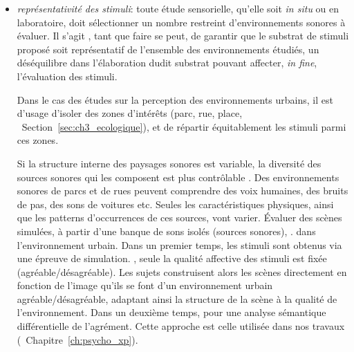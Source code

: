 \begin{itemize}
\item \emph{représentativité des stimuli}: toute étude sensorielle, qu'elle soit \emph{in situ} ou en laboratoire, doit sélectionner un nombre restreint d'environnements sonores à évaluer. Il s'agit , tant que faire se peut, de garantir que le substrat de stimuli proposé soit représentatif de l'ensemble des environnements étudiés, un déséquilibre dans l'élaboration dudit substrat pouvant affecter, \emph{in fine}, l'évaluation des stimuli. 

Dans le cas des études sur la perception des environnements urbains, il est d'usage d'isoler des zones d’intérêts (parc, rue, place, \cf~Section~\ref{sec:ch3_ecologique}), et de répartir équitablement les stimuli parmi ces zones.  

Si la structure interne des paysages sonores est variable, la diversité des sources sonores qui les composent est plus contrôlable . Des environnements sonores de parcs et de rues peuvent comprendre des voix humaines, des bruits de pas, des sons de voitures etc. Seules les caractéristiques physiques, ainsi que les patterns d'occurrences de ces sources, vont varier. Évaluer des scènes simulées, à partir d'une banque de sons isolés (sources sonores),  .   dans l'environnement urbain. Dans un premier temps, les stimuli sont obtenus via une épreuve de simulation.  , seule la qualité affective des stimuli est fixée (agréable/désagréable). Les sujets construisent alors les scènes directement en fonction de l'image qu'ils se font d'un environnement urbain agréable/désagréable, adaptant ainsi la structure de la scène à la qualité de l'environnement. Dans un deuxième temps,   pour une analyse sémantique différentielle de l'agrément. Cette approche est  celle utilisée dans nos travaux (\cf~Chapitre~\ref{ch:psycho_xp}). 


\end{itemize}
